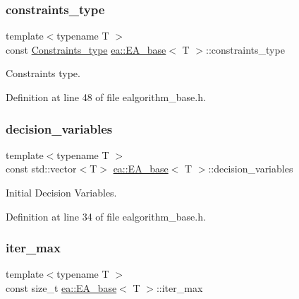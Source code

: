\subsubsection{\texorpdfstring{constraints\+\_\+type}{constraints\_type}}
{\footnotesize\ttfamily template$<$typename T $>$ \\
const \hyperlink{namespaceutilities_ab1a1517bf6e62a1acfab5293ca8985c1}{Constraints\+\_\+type} \hyperlink{structea_1_1_e_a__base}{ea\+::\+E\+A\+\_\+base}$<$ T $>$\+::constraints\+\_\+type}



Constraints type. 



Definition at line 48 of file ealgorithm\+\_\+base.\+h.

\mbox{\label{structea_1_1_e_a__base_a71e09437e78efc6e93e0a6e510d13100}} 
\subsubsection{\texorpdfstring{decision\+\_\+variables}{decision\_variables}}
{\footnotesize\ttfamily template$<$typename T $>$ \\
const std\+::vector$<$T$>$ \hyperlink{structea_1_1_e_a__base}{ea\+::\+E\+A\+\_\+base}$<$ T $>$\+::decision\+\_\+variables}



Initial Decision Variables. 



Definition at line 34 of file ealgorithm\+\_\+base.\+h.

\mbox{\label{structea_1_1_e_a__base_affe85fad1da440e091a9d09cf46d502f}} 
\subsubsection{\texorpdfstring{iter\+\_\+max}{iter\_max}}
{\footnotesize\ttfamily template$<$typename T $>$ \\
const size\+\_\+t \hyperlink{structea_1_1_e_a__base}{ea\+::\+E\+A\+\_\+base}$<$ T $>$\+::iter\+\_\+max}



